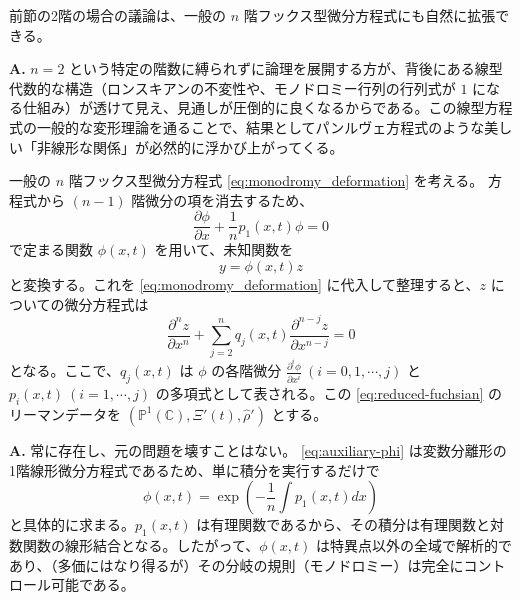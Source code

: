 
前節の2階の場合の議論は、一般の $n$ 階フックス型微分方程式にも自然に拡張できる。

\begin{Q}
\textbf{A.} $n=2$ という特定の階数に縛られずに論理を展開する方が、背後にある線型代数的な構造（ロンスキアンの不変性や、モノドロミー行列の行列式が $1$ になる仕組み）が透けて見え、見通しが圧倒的に良くなるからである。この線型方程式の一般的な変形理論を通ることで、結果としてパンルヴェ方程式のような美しい「非線形な関係」が必然的に浮かび上がってくる。
\end{Q}

一般の $n$ 階フックス型微分方程式 \eqref{eq:monodromy_deformation} を考える。
方程式から $(n-1)$ 階微分の項を消去するため、
\begin{equation}\label{eq:auxiliary-phi}
\frac{\partial \phi}{\partial x} + \frac{1}{n}p_{1}(x,t)\phi = 0
\end{equation}
で定まる関数 $\phi(x,t)$ を用いて、未知関数を
\[
y = \phi(x,t)z
\]
と変換する。これを \eqref{eq:monodromy_deformation} に代入して整理すると、$z$ についての微分方程式は
\begin{equation}\label{eq:reduced-fuchsian}
\frac{\partial^{n}z}{\partial x^{n}} + \sum_{j=2}^{n} q_{j}(x,t)\frac{\partial^{n-j}z}{\partial x^{n-j}} = 0
\end{equation}
となる。ここで、$q_{j}(x,t)$ は $\phi$ の各階微分 $\frac{\partial^i \phi}{\partial x^i} \ (i=0,1,\cdots,j)$ と $p_{i}(x,t) \ (i=1,\cdots,j)$ の多項式として表される。この \eqref{eq:reduced-fuchsian} のリーマンデータを $(\mathbb{P}^{1}(\mathbb{C}), \Xi'(t), \hat{\rho}')$ とする。

\begin{Q}
\textbf{A.} 常に存在し、元の問題を壊すことはない。
\eqref{eq:auxiliary-phi} は変数分離形の1階線形微分方程式であるため、単に積分を実行するだけで
\[
\phi(x,t) = \exp\left( -\frac{1}{n} \int p_1(x,t) dx \right)
\]
と具体的に求まる。$p_1(x,t)$ は有理関数であるから、その積分は有理関数と対数関数の線形結合となる。したがって、$\phi(x,t)$ は特異点以外の全域で解析的であり、（多価にはなり得るが）その分岐の規則（モノドロミー）は完全にコントロール可能である。
\end{Q}


